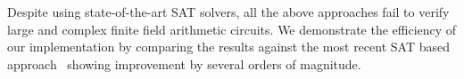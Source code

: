 Despite using state-of-the-art SAT solvers, all the above approaches
fail to verify large and complex finite field arithmetic circuits. 
We demonstrate the efficiency of our implementation by comparing the results against the most recent SAT based approach~\cite{fujita:2015}
showing improvement by several orders of magnitude. 






 
